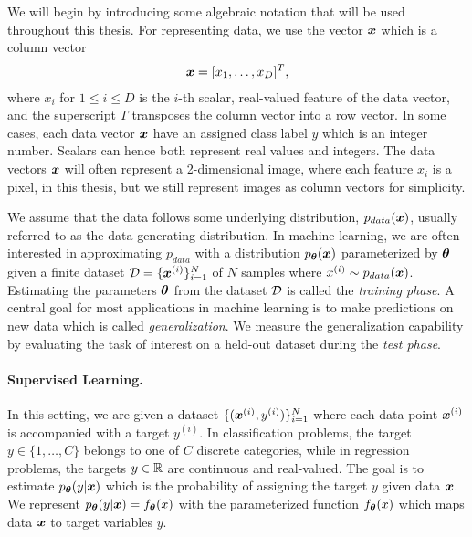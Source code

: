 We will begin by introducing some algebraic notation that will be used throughout this thesis. For representing data, we use the vector ${\bm{x}}$ which is a column vector 
\begin{align*}
	{\bm{x}} = [x_1, \dots, x_D]^T,
\end{align*}
where $x_i$ for $1 \leq i \leq D$ is the $i$-th scalar, real-valued feature of the data vector, and the superscript $T$ transposes the column vector into a row vector. In some cases, each data vector ${\bm{x}}$ have an assigned class label $y$ which is an integer number. Scalars can hence both represent real values and integers. The data vectors ${\bm{x}}$ will often represent a 2-dimensional image, where each feature $x_i$ is a pixel, in this thesis, but we still represent images as column vectors for simplicity. 

We assume that the data follows some underlying distribution, $p_{data}({\bm{x}})$, usually referred to as the data generating distribution. In machine learning, we are often interested in approximating $p_{data}$ with a distribution $p_{{\bm{\theta}}}({\bm{x}})$ parameterized by ${\bm{\theta}}$ given a finite dataset ${\mathcal{D}} = \{{\bm{x}}^{(i)}\}_{i=1}^{N}$ of $N$ samples where $x^{(i)} \sim p_{data}({\bm{x}})$. Estimating the parameters ${\bm{\theta}}$ from the dataset ${\mathcal{D}}$ is called the \textit{training phase}. A central goal for most applications in machine learning is to make predictions on new data which is called \textit{generalization}. We measure the generalization capability by evaluating the task of interest on a held-out dataset during the \textit{test phase}.

\vspace{-3mm}
\paragraph{Supervised Learning.} In this setting, we are given a dataset $\{({\bm{x}}^{(i)}, y^{(i)})\}_{i=1}^{N}$ where each data point ${\bm{x}}^{(i)}$ is accompanied with a target $y^{(i)}$. In classification problems, the target $y \in \{1, \dots, C\}$ belongs to one of $C$ discrete categories, while in regression problems, the targets $y \in \mathbb{R}$ are continuous and real-valued. The goal is to estimate $p_{{\bm{\theta}}}(y | {\bm{x}})$ which is the probability of assigning the target $y$ given data ${\bm{x}}$. We represent $p_{{\bm{\theta}}}(y | {\bm{x}}) = f_{{\bm{\theta}}}(x)$ with the parameterized function $f_{{\bm{\theta}}}(x)$ which maps data ${\bm{x}}$ to target variables $y$.  


